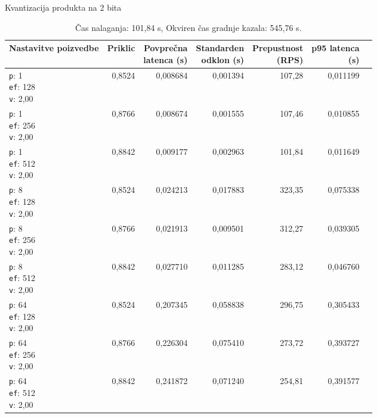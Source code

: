 \begin{table}[htbp]
  \centering
\small
  \caption{Kvantizacija produkta na 2 bita}
  \label{tab:single-2cpu-4ram:pqx16:qdrant-dipl-baseline-tenant-subgraph-pqx16-m16-ef-128-random-768-100-tenants-extended-upload-2026-08-18-07-19-46.json}
  \begin{tabularx}{\textwidth}{Xrrrrrr}
    \toprule
    Nastavitve poizvedbe & Priklic & \makecell{Povprečna\\latenca (s)} & \makecell{Standarden\\odklon (s)} & \makecell{Prepustnost\\(RPS)} & \makecell{p95 latenca\\(s)}  \\
    \midrule
    \makecell{\texttt{p}: 1\\\texttt{ef}: 128\\\texttt{v}: 2,00} & 0,8524 & 0,008684 & 0,001394 & 107,28 & 0,011199 \\
    \makecell{\texttt{p}: 1\\\texttt{ef}: 256\\\texttt{v}: 2,00} & 0,8766 & 0,008674 & 0,001555 & 107,46 & 0,010855 \\
    \makecell{\texttt{p}: 1\\\texttt{ef}: 512\\\texttt{v}: 2,00} & 0,8842 & 0,009177 & 0,002963 & 101,84 & 0,011649 \\
    \makecell{\texttt{p}: 8\\\texttt{ef}: 128\\\texttt{v}: 2,00} & 0,8524 & 0,024213 & 0,017883 & 323,35 & 0,075338 \\
    \makecell{\texttt{p}: 8\\\texttt{ef}: 256\\\texttt{v}: 2,00} & 0,8766 & 0,021913 & 0,009501 & 312,27 & 0,039305 \\
    \makecell{\texttt{p}: 8\\\texttt{ef}: 512\\\texttt{v}: 2,00} & 0,8842 & 0,027710 & 0,011285 & 283,12 & 0,046760 \\
    \makecell{\texttt{p}: 64\\\texttt{ef}: 128\\\texttt{v}: 2,00} & 0,8524 & 0,207345 & 0,058838 & 296,75 & 0,305433 \\
    \makecell{\texttt{p}: 64\\\texttt{ef}: 256\\\texttt{v}: 2,00} & 0,8766 & 0,226304 & 0,075410 & 273,72 & 0,393727 \\
    \makecell{\texttt{p}: 64\\\texttt{ef}: 512\\\texttt{v}: 2,00} & 0,8842 & 0,241872 & 0,071240 & 254,81 & 0,391577 \\
    \bottomrule
  \end{tabularx}
\caption* {Čas nalaganja: 101,84 s, Okviren čas gradnje kazala: 545,76 s.}\end{table}

